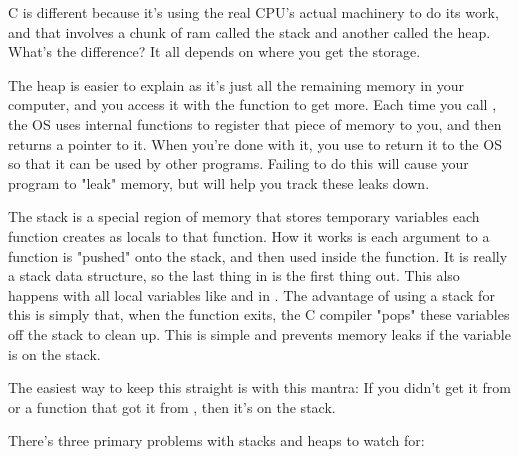 C is different because it's using the real CPU's actual machinery to do its
work, and that involves a chunk of ram called the stack and another 
called the heap.  What's the difference?  It all depends on where you
get the storage.

The heap is easier to explain as it's just all the remaining memory in
your computer, and you access it with the function  to
get more.  Each time you call , the OS uses internal 
functions to register that piece of memory to you, and then returns
a pointer to it.  When you're done with it, you use  to
return it to the OS so that it can be used by other programs.  Failing
to do this will cause your program to "leak" memory, but 
will help you track these leaks down.

The stack is a special region of memory that stores temporary variables each
function creates as locals to that function.  How it works is each argument to
a function is "pushed" onto the stack, and then used inside the function.  It
is really a stack data structure, so the last thing in is the first thing out.
This also happens with all local variables like  and
 in .  The advantage of using a stack for this is
simply that, when the function exits, the C compiler "pops" these variables off
the stack to clean up.  This is simple and prevents memory leaks if the
variable is on the stack.

The easiest way to keep this straight is with this mantra:  If you
didn't get it from  or a function that got it from ,
then it's on the stack.

There's three primary problems with stacks and heaps to watch for:

